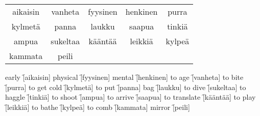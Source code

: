 \begin{center}
  \begin{tabular}{|c c c c c|}
    \hline
    aikaisin & vanheta & fyysinen & henkinen & purra \\
    kylmetä & panna & laukku & saapua & tinkiä \\
    ampua & sukeltaa & kääntää & leikkiä & kylpeä \\
    kammata & peili &&&\\
    \hline
  \end{tabular}
\end{center}

\begin{questions}
  \begin{multicols}{3}
    \raggedcolumns
    \question early \f[aikaisin]
    \question physical \f[fyysinen]
    \question mental \f[henkinen]
    \question to age \f[vanheta]
    \question to bite \f[purra]
    \question to get cold \f[kylmetä]
    \question to put \f[panna]
    \question bag \f[laukku]
    \question to dive \f[sukeltaa]
    \question to haggle \f[tinkiä]
    \question to shoot  \f[ampua]
    \question to arrive \f[saapua]
    \question to translate \f[kääntää]
    \question to play \f[leikkiä]
    \question to bathe \f[kylpeä]
    \question to comb \f[kammata]
    \question mirror \f[peili]
  \end{multicols}
\end{questions}
